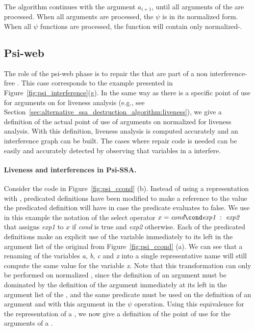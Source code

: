 The algorithm continues with the argument ${a_{i+1}}$, until all
arguments of the \psifun are processed. When all arguments
are processed, the $\psi$ is in its normalized form. When all $\psi$
functions are processed, the function will contain only
normalized-\psifuns.


\subsection{Psi-web}

The role of the psi-web\index{\psiweb} phase is to repair the \psifuns that are part of a non interference-free \psiweb. 
This case corresponds to the example presented in
Figure~\ref{fig:psi_interference}(g).
%
In the same way as there is a specific point of use for arguments on
\phifuns for liveness analysis (e.g., see Section~\ref{sec:alternative_ssa_destruction_algorithm:liveness}), we give a definition of the
actual point of use of arguments on normalized \psifuns for liveness
analysis. With this definition, liveness analysis is computed
accurately and an interference graph can be built. The cases where repair code is needed can be easily and
accurately detected by observing that variables in a
\psifun interfere.

\paragraph{Liveness and interferences in Psi-SSA.}
Consider the code in Figure~\ref{fig:psi_ccond} (b). Instead of using
a representation with \psifuns, predicated definitions have
been modified to make a reference to the value the predicated
definition will have in case the predicate evaluates to false. We use in this
example the notation of the select operator
$x = \textit{cond}\cond \textit{exp1}~:~\textit{exp2}$ that assigns \textit{exp1} to $x$ if \textit{cond} is true and \textit{exp2} otherwise. 
Each of the predicated definitions make an
explicit use of the variable immediately to its left in the argument
list of the original \psifun from Figure~\ref{fig:psi_ccond}
(a). We can see that a renaming of the variables \textit{a}, \textit{b},
\textit{c} and \textit{x} into a single representative name will still
compute the same value for the variable \textit{x}. Note that this
transformation can only be performed on normalized \psifuns,
since the definition of an argument must be dominated by the
definition of the argument immediately at its left in the argument
list of the \psifun, and the same predicate must be used on the
 definition of an argument and with this argument in the $\psi$ operation.
Using this equivalence for the
representation of a \psifun, we now give a definition of the
point of use for the arguments of a \psifun.

